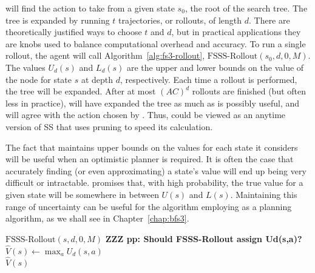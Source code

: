  will find the action to take from a given state $s_0$, the root of the search tree.  The tree is expanded by running $t$ trajectories, or rollouts, of length $d$. There are theoretically justified ways to choose $t$ and $d$, but in practical applications they are knobs used to balance computational overhead and accuracy. To run a single rollout, the agent will call Algorithm~\ref{alg:fs3-rollout}, $\mbox{FSSS-Rollout}(s_0, d, 0, M)$.
The values $U_d(s)$ and $L_d(s)$ are the upper and lower bounds on the value of the node for state $s$ at depth $d$, respectively. Each time a rollout is performed, the tree will be expanded. After at most $(AC)^d$ rollouts are finished (but often less in practice),  will have expanded the tree as much as is possibly useful, and will agree with the action chosen by . Thus,  could be viewed as an anytime version of SS that uses pruning to speed its calculation.

The fact that  maintains upper bounds on the values for each state it considers will be useful when an optimistic planner is required. It is often the case that accurately finding (or even approximating) a state's value will end up being very difficult or intractable.  promises that, with high probability, the true value for a given state will be somewhere in between $U(s)$ and $L(s)$. Maintaining this range of uncertainty can be useful for the algorithm employing  as a planning algorithm, as we shall see in Chapter~\ref{chap:bfs3}.

\begin{algorithm}[tb]
	\caption{$\mbox{FSSS}(s, d, t, M)$}
	\label{alg:fs3}

	 {
		$\mbox{FSSS-Rollout}(s, d, 0, M)$
	}
	{\bf ZZZ pp: Should FSSS-Rollout assign Ud(s,a)?}
	$\hat V(s) \leftarrow \max_a U_d(s, a)$\\
	\Return $\hat V(s)$
\end{algorithm}

